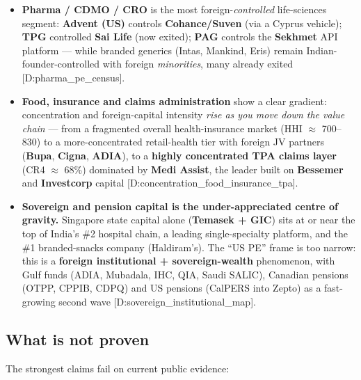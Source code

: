 \documentclass[11pt,a4paper]{article}
\newcommand{\cs}[1]{\textnormal{[#1]}}
\begin{document}
\begin{itemize}[leftmargin=1.4em,itemsep=4pt]
\item \textbf{Pharma / CDMO / CRO} is the most foreign-\emph{controlled} life-sciences segment: \textbf{Advent (US)} controls \textbf{Cohance/Suven} (via a Cyprus vehicle); \textbf{TPG} controlled \textbf{Sai Life} (now exited); \textbf{PAG} controls the \textbf{Sekhmet} API platform --- while branded generics (Intas, Mankind, Eris) remain Indian-founder-controlled with foreign \emph{minorities}, many already exited \cs{D:pharma\_pe\_census}.

\item \textbf{Food, insurance and claims administration} show a clear gradient: concentration and foreign-capital intensity \emph{rise as you move down the value chain} --- from a fragmented overall health-insurance market (HHI $\approx$ 700--830) to a more-concentrated retail-health tier with foreign JV partners (\textbf{Bupa}, \textbf{Cigna}, \textbf{ADIA}), to a \textbf{highly concentrated TPA claims layer} (CR4 $\approx$ 68\%) dominated by \textbf{Medi Assist}, the leader built on \textbf{Bessemer} and \textbf{Investcorp} capital \cs{D:concentration\_food\_insurance\_tpa}.

\item \textbf{Sovereign and pension capital is the under-appreciated centre of gravity.} Singapore state capital alone (\textbf{Temasek + GIC}) sits at or near the top of India's \#2 hospital chain, a leading single-specialty platform, and the \#1 branded-snacks company (Haldiram's). The ``US PE'' frame is too narrow: this is a \textbf{foreign institutional + sovereign-wealth} phenomenon, with Gulf funds (ADIA, Mubadala, IHC, QIA, Saudi SALIC), Canadian pensions (OTPP, CPPIB, CDPQ) and US pensions (CalPERS into Zepto) as a fast-growing second wave \cs{D:sovereign\_institutional\_map}.
\end{itemize}

\subsection{What is not proven}
The strongest claims fail on current public evidence:
\end{document}
